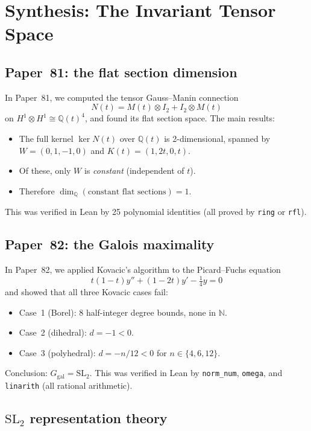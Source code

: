 \documentclass[11pt]{article}
\theoremstyle{plain}
\theoremstyle{definition}
\theoremstyle{remark}
\newcommand{\N}{\mathbb{N}}
\newcommand{\Q}{\mathbb{Q}}
\newcommand{\SL}{\mathrm{SL}}
\newcommand{\Ggal}{G_{\mathrm{gal}}}
\begin{document}
\section{Synthesis: The Invariant Tensor Space}
\label{sec:synthesis}

\subsection{Paper~81: the flat section dimension}

In Paper~81, we computed the tensor Gauss--Manin connection
\[
  N(t) = M(t) \otimes I_2 + I_2 \otimes M(t)
\]
on $H^1 \otimes H^1 \cong \Q(t)^4$, and found its flat section space.
The main results:
\begin{itemize}
  \item The full kernel $\ker N(t)$ over $\Q(t)$ is 2-dimensional, spanned by $W = (0,1,-1,0)$ and $K(t) = (1, 2t, 0, t)$.
  \item Of these, only $W$ is \emph{constant} (independent of $t$).
  \item Therefore $\dim_\Q(\text{constant flat sections}) = 1$.
\end{itemize}
This was verified in Lean by 25 polynomial identities (all proved by \texttt{ring} or \texttt{rfl}).

\subsection{Paper~82: the Galois maximality}

In Paper~82, we applied Kovacic's algorithm to the Picard--Fuchs equation
\[
  t(1-t)y'' + (1-2t)y' - \tfrac{1}{4}y = 0
\]
and showed that all three Kovacic cases fail:
\begin{itemize}
  \item Case~1 (Borel): 8 half-integer degree bounds, none in $\N$.
  \item Case~2 (dihedral): $d = -1 < 0$.
  \item Case~3 (polyhedral): $d = -n/12 < 0$ for $n \in \{4, 6, 12\}$.
\end{itemize}
Conclusion: $\Ggal = \SL_2$.
This was verified in Lean by \texttt{norm\_num}, \texttt{omega}, and \texttt{linarith} (all rational arithmetic).

\subsection{$\SL_2$ representation theory}
\end{document}
